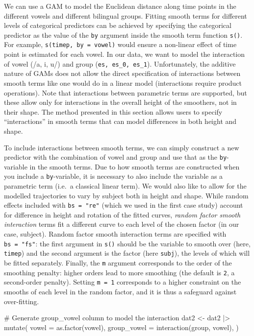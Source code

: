 \documentclass[
  letterpaper,
  DIV=11,
  numbers=noendperiod]{scrartcl}
\newenvironment{Shaded}{\begin{snugshade}}{\end{snugshade}}
\newcommand{\AttributeTok}[1]{\textcolor[rgb]{0.40,0.45,0.13}{#1}}
\newcommand{\CommentTok}[1]{\textcolor[rgb]{0.37,0.37,0.37}{#1}}
\newcommand{\FunctionTok}[1]{\textcolor[rgb]{0.28,0.35,0.67}{#1}}
\newcommand{\NormalTok}[1]{\textcolor[rgb]{0.00,0.23,0.31}{#1}}
\newcommand{\OtherTok}[1]{\textcolor[rgb]{0.00,0.23,0.31}{#1}}
\newcommand{\SpecialCharTok}[1]{\textcolor[rgb]{0.37,0.37,0.37}{#1}}
\begin{document}
We can use a GAM to model the Euclidean distance along time points in
the different vowels and different bilingual groups. Fitting smooth
terms for different levels of categorical predictors can be achieved by
specifying the categorical predictor as the value of the \texttt{by}
argument inside the smooth term function \texttt{s()}. For example,
\texttt{s(timep,\ by\ =\ vowel)} would ensure a non-linear effect of
time point is estimated for each vowel. In our data, we want to model
the interaction of vowel (/a, i, u/) and group
(\texttt{es,\ es\_0,\ es\_1}). Unfortunately, the additive nature of
GAMs does not allow the direct specification of interactions between
smooth terms like one would do in a linear model (interactions require
product operations). Note that interactions between parametric terms are
supported, but these allow only for interactions in the overall height
of the smoothers, not in their shape. The method presented in this
section allows users to specify ``interactions'' in smooth terms that
can model differences in both height and shape.

To include interactions between smooth terms, we can simply construct a
new predictor with the combination of vowel and group and use that as
the \texttt{by}-variable in the smooth terms. Due to how smooth terms
are constructed when you include a \texttt{by}-variable, it is necessary
to also include the variable as a parametric term (i.e.~a classical
linear term). We would also like to allow for the modelled trajectories
to vary by subject both in height and shape. While random effects
included with \texttt{bs\ =\ "re"} (which we used in the first case
study) account for difference in height and rotation of the fitted
curves, \emph{random factor smooth interaction} terms fit a different
curve to each level of the chosen factor (in our case, subject). Random
factor smooth interaction terms are specified with \texttt{bs\ =\ "fs"}:
the first argument in \texttt{s()} should be the variable to smooth over
(here, \texttt{timep}) and the second argument is the factor (here
\texttt{subj}), the levels of which will be fitted separately. Finally,
the \texttt{m} argument corresponds to the order of the smoothing
penalty: higher orders lead to more smoothing (the default is
\texttt{2}, a second-order penalty). Setting \texttt{m\ =\ 1}
corresponds to a higher constraint on the smooths of each level in the
random factor, and it is thus a safeguard against over-fitting.

\begin{Shaded}
\begin{Highlighting}[]
\CommentTok{\# Generate group\_vowel column to model the interaction}
\NormalTok{dat2 }\OtherTok{\textless{}{-}}\NormalTok{ dat2 }\SpecialCharTok{|\textgreater{}}
  \FunctionTok{mutate}\NormalTok{(}
    \AttributeTok{vowel =} \FunctionTok{as.factor}\NormalTok{(vowel),}
    \AttributeTok{group\_vowel =} \FunctionTok{interaction}\NormalTok{(group, vowel),}
\NormalTok{  )}
\end{Highlighting}
\end{Shaded}
\end{document}
